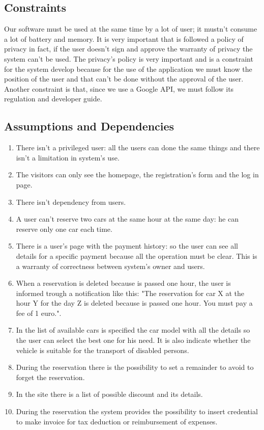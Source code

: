 
\subsection{Constraints} \label{subsec:constraints}
Our software must be used at the same time by a lot of user; it mustn't consume a lot of battery and memory. It is very important that is followed a policy of privacy in fact, if the user doesn't sign and approve the warranty of privacy the system can't be used. The privacy's policy is very important and is a constraint for the system develop because for the use of the application we must know the position of the user and that can't be done without the approval of the user. Another constraint is that, since we use a Google API, we must follow its regulation and developer guide.


\subsection{Assumptions and Dependencies} \label{subsec:dependencies}
\begin{enumerate}
\item There isn't a privileged user: all the users can done the same things and there isn't a limitation in system's use.
\item The visitors can only see the homepage, the registration's form and the log in page.
\item There isn't dependency from users.
\item A user can't reserve two cars at the same hour at the same day: he can reserve only one car each time.
\item There is a user's page with the payment history: so the user can see all details for a specific payment because all the operation must be clear. This is a warranty of correctness between system's owner and users.
\item When a reservation is deleted because is passed one hour, the user is informed trough a notification like this: "The reservation for car X at the hour Y for the day Z is deleted because is passed one hour. You must pay a fee of 1 euro.".
\item In the list of available cars is specified the car model with all the details so the user can select the best one for his need. It is also indicate whether the vehicle is suitable for the transport of disabled persons.
\item During the reservation there is the possibility to set a remainder to avoid to forget the reservation.
\item In the site there is a list of possible discount and its details.
\item During the reservation the system provides the possibility to insert credential to make invoice 
for tax deduction or reimbursement of expenses.
\end{enumerate}

